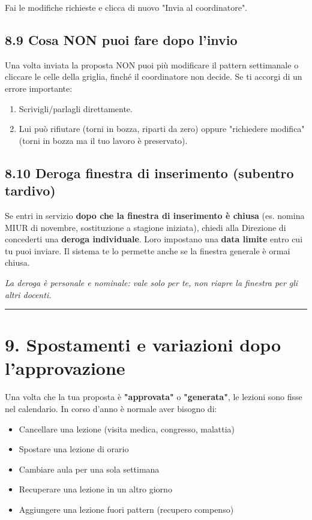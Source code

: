 \documentclass[11pt,a4paper]{article}
\renewenvironment{quote}
  {\begin{list}{}{%
      \setlength{\leftmargin}{8pt}%
      \setlength{\rightmargin}{8pt}%
      \setlength{\topsep}{6pt}%
      \setlength{\parsep}{0pt}}%
      \item\relax\color{black!75}\itshape}
  {\end{list}}
\begin{document}
Fai le modifiche richieste e clicca di nuovo "Invia al coordinatore".

\subsection{8.9 Cosa NON puoi fare dopo l'invio}


Una volta inviata la proposta NON puoi più modificare il pattern settimanale o cliccare le celle della griglia, finché il coordinatore non decide. Se ti accorgi di un errore importante:

\begin{enumerate}
  \item Scrivigli/parlagli direttamente.
  \item Lui può rifiutare (torni in bozza, riparti da zero) oppure "richiedere modifica" (torni in bozza ma il tuo lavoro è preservato).
\end{enumerate}

\subsection{8.10 Deroga finestra di inserimento (subentro tardivo)}


Se entri in servizio \textbf{dopo che la finestra di inserimento è chiusa} (es. nomina MIUR di novembre, sostituzione a stagione iniziata), chiedi alla Direzione di concederti una \textbf{deroga individuale}. Loro impostano una \textbf{data limite} entro cui tu puoi inviare. Il sistema te lo permette anche se la finestra generale è ormai chiusa.

\begin{quote}
La deroga è personale e nominale: vale solo per te, non riapre la finestra per gli altri docenti.
\end{quote}

\medskip\hrule\medskip

\section{9. Spostamenti e variazioni dopo l'approvazione}


Una volta che la tua proposta è \textbf{"approvata"} o \textbf{"generata"}, le lezioni sono fisse nel calendario. In corso d'anno è normale aver bisogno di:

\begin{itemize}
  \item Cancellare una lezione (visita medica, congresso, malattia)
  \item Spostare una lezione di orario
  \item Cambiare aula per una sola settimana
  \item Recuperare una lezione in un altro giorno
  \item Aggiungere una lezione fuori pattern (recupero compenso)
\end{itemize}
\end{document}
